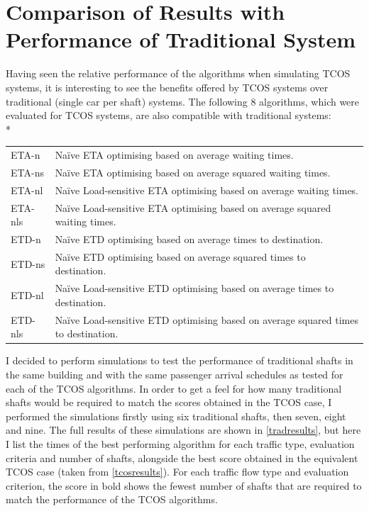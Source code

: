 \documentclass{UoYCSproject}
\begin{document}
\section{Comparison of Results with Performance of Traditional System}
\label{tcosvssingle}

Having seen the relative performance of the algorithms when simulating TCOS systems,  it is interesting to see the benefits offered by TCOS systems over traditional (single car per shaft) systems.  The following 8 algorithms, which were evaluated for TCOS systems, are also compatible with traditional systems:\\*

\begin{tabularx}{\linewidth}{l X}
	ETA-n		& Na\"{i}ve ETA optimising based on average waiting times. \\
	ETA-ns		& Na\"{i}ve ETA optimising based on average squared waiting times. \\
	ETA-nl		& Na\"{i}ve Load-sensitive ETA optimising based on average waiting times. \\
	ETA-nls		& Na\"{i}ve Load-sensitive ETA optimising based on average squared waiting times. \\
	ETD-n		& Na\"{i}ve ETD optimising based on average times to destination. \\
	ETD-ns		& Na\"{i}ve ETD optimising based on average squared times to destination. \\
	ETD-nl		& Na\"{i}ve Load-sensitive ETD optimising based on average times to destination. \\
	ETD-nls		& Na\"{i}ve Load-sensitive ETD optimising based on average squared times to destination.
\end{tabularx}

I decided to perform simulations to test the performance of traditional shafts in the same building and with the same passenger arrival schedules as tested for each of the TCOS algorithms.  In order to get a feel for how many traditional shafts would be required to match the scores obtained in the TCOS case, I performed the simulations firstly using six traditional shafts, then seven, eight and nine.  The full results of these simulations are shown in \autoref{tradresults}, but here I list the times of the best performing algorithm for each traffic type, evaluation criteria and number of shafts, alongside the best score obtained in the equivalent TCOS case (taken from \autoref{tcosresults}).  For each traffic flow type and evaluation criterion, the score in bold shows the fewest number of shafts that are required to match the performance of the TCOS algorithms.
\end{document}

